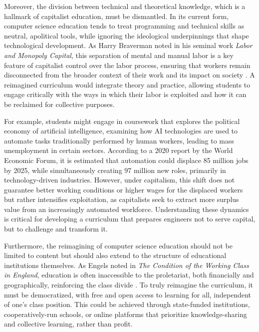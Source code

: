 \begin{refsection}
Moreover, the division between technical and theoretical knowledge, which is a hallmark of capitalist education, must be dismantled. In its current form, computer science education tends to treat programming and technical skills as neutral, apolitical tools, while ignoring the ideological underpinnings that shape technological development. As Harry Braverman noted in his seminal work \textit{Labor and Monopoly Capital}, this separation of mental and manual labor is a key feature of capitalist control over the labor process, ensuring that workers remain disconnected from the broader context of their work and its impact on society \cite[pp.~78]{braverman1974labor}. A reimagined curriculum would integrate theory and practice, allowing students to engage critically with the ways in which their labor is exploited and how it can be reclaimed for collective purposes.

For example, students might engage in coursework that explores the political economy of artificial intelligence, examining how AI technologies are used to automate tasks traditionally performed by human workers, leading to mass unemployment in certain sectors. According to a 2020 report by the World Economic Forum, it is estimated that automation could displace 85 million jobs by 2025, while simultaneously creating 97 million new roles, primarily in technology-driven industries. However, under capitalism, this shift does not guarantee better working conditions or higher wages for the displaced workers but rather intensifies exploitation, as capitalists seek to extract more surplus value from an increasingly automated workforce. Understanding these dynamics is critical for developing a curriculum that prepares engineers not to serve capital, but to challenge and transform it.

Furthermore, the reimagining of computer science education should not be limited to content but should also extend to the structure of educational institutions themselves. As Engels noted in \textit{The Condition of the Working Class in England}, education is often inaccessible to the proletariat, both financially and geographically, reinforcing the class divide \cite[pp.~152]{engels1987condition}. To truly reimagine the curriculum, it must be democratized, with free and open access to learning for all, independent of one's class position. This could be achieved through state-funded institutions, cooperatively-run schools, or online platforms that prioritize knowledge-sharing and collective learning, rather than profit.


\end{refsection}
